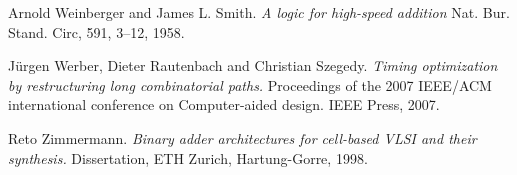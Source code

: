 \documentclass[11pt,final,microtype]{scrartcl}
\theoremstyle{plain}
\theoremstyle{definition}
\theoremstyle{remark}
\begin{document}
\begin{thebibliography}{10}
 Arnold Weinberger and James L. Smith.
  \emph{ A logic for high-speed addition}
  Nat. Bur. Stand. Circ, 591, 3--12,  1958.

 J\"urgen Werber, Dieter Rautenbach and
  Christian Szegedy. \emph{Timing optimization by restructuring long
    combinatorial paths.} Proceedings of the 2007 IEEE/ACM
  international conference on Computer-aided design. IEEE Press, 2007.


 Reto Zimmermann. \emph{Binary adder
    architectures for cell-based VLSI and their synthesis.}
  Dissertation, ETH Zurich, Hartung-Gorre, 1998.
\end{thebibliography}
 
\end{document}
